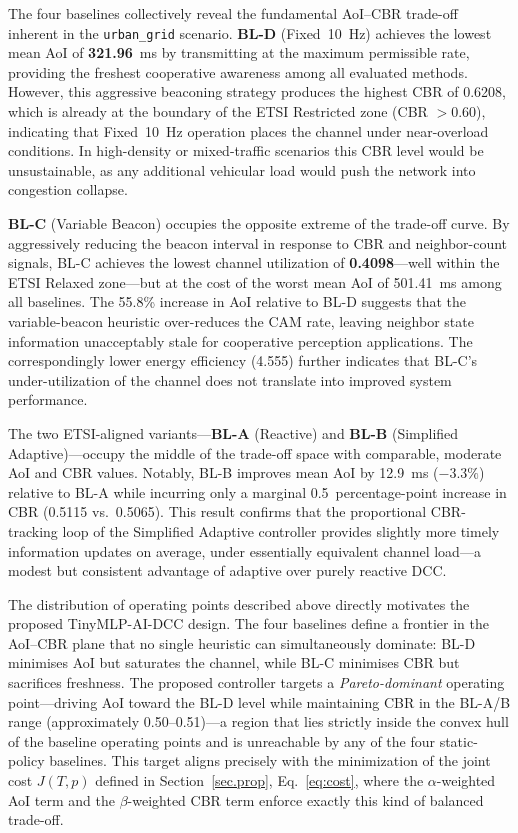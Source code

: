 \documentclass[journal]{IEEEtran}
\begin{document}
The four baselines collectively reveal the fundamental AoI--CBR
trade-off inherent in the \texttt{urban\_grid} scenario.
\textbf{BL-D} (Fixed~10~Hz) achieves the lowest mean AoI of
\textbf{321.96}~ms by transmitting at the maximum permissible rate,
providing the freshest cooperative awareness among all evaluated
methods.  However, this aggressive beaconing strategy produces the
highest CBR of 0.6208, which is already at the boundary of the ETSI
Restricted zone (CBR $> 0.60$), indicating that Fixed~10~Hz
operation places the channel under near-overload conditions.  In
high-density or mixed-traffic scenarios this CBR level would be
unsustainable, as any additional vehicular load would push the network
into congestion collapse.

\textbf{BL-C} (Variable Beacon) occupies the opposite extreme of the
trade-off curve.  By aggressively reducing the beacon interval in
response to CBR and neighbor-count signals, BL-C achieves the lowest
channel utilization of \textbf{0.4098}---well within the ETSI Relaxed
zone---but at the cost of the worst mean AoI of 501.41~ms among all
baselines.  The 55.8\% increase in AoI relative to BL-D suggests that
the variable-beacon heuristic over-reduces the CAM rate, leaving
neighbor state information unacceptably stale for cooperative
perception applications.  The correspondingly lower energy efficiency
(4.555) further indicates that BL-C's under-utilization of the channel
does not translate into improved system performance.

The two ETSI-aligned variants---\textbf{BL-A} (Reactive) and
\textbf{BL-B} (Simplified Adaptive)---occupy the middle of the
trade-off space with comparable, moderate AoI and CBR values.
Notably, BL-B improves mean AoI by 12.9~ms ($-3.3\%$) relative to
BL-A while incurring only a marginal 0.5~percentage-point increase in
CBR (0.5115 vs.\ 0.5065).  This result confirms that the
proportional CBR-tracking loop of the Simplified Adaptive controller
provides slightly more timely information updates on average, under
essentially equivalent channel load---a modest but consistent
advantage of adaptive over purely reactive DCC.

The distribution of operating points described above directly
motivates the proposed TinyMLP-AI-DCC design.  The four baselines
define a frontier in the AoI--CBR plane that no single heuristic can
simultaneously dominate: BL-D minimises AoI but saturates the channel,
while BL-C minimises CBR but sacrifices freshness.  The proposed
controller targets a \emph{Pareto-dominant} operating point---driving
AoI toward the BL-D level while maintaining CBR in the BL-A/B range
(approximately 0.50--0.51)---a region that lies strictly inside the
convex hull of the baseline operating points and is unreachable by any
of the four static-policy baselines.  This target aligns precisely
with the minimization of the joint cost $J(T, p)$ defined in
Section~\ref{sec.prop}, Eq.~\eqref{eq:cost}, where the
$\alpha$-weighted AoI term and the $\beta$-weighted CBR term enforce
exactly this kind of balanced trade-off.
\end{document}
